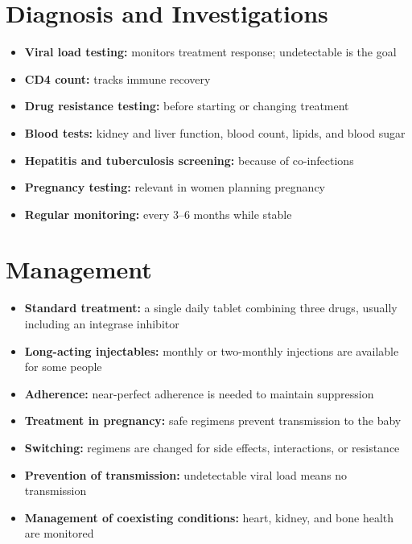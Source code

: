 \section*{Diagnosis and Investigations}
\begin{itemize}
    \item \textbf{Viral load testing:} monitors treatment response; undetectable is the goal
    \item \textbf{CD4 count:} tracks immune recovery
    \item \textbf{Drug resistance testing:} before starting or changing treatment
    \item \textbf{Blood tests:} kidney and liver function, blood count, lipids, and blood sugar
    \item \textbf{Hepatitis and tuberculosis screening:} because of co-infections
    \item \textbf{Pregnancy testing:} relevant in women planning pregnancy
    \item \textbf{Regular monitoring:} every 3--6 months while stable
\end{itemize}

\section*{Management}
\begin{itemize}
    \item \textbf{Standard treatment:} a single daily tablet combining three drugs, usually including an integrase inhibitor
    \item \textbf{Long-acting injectables:} monthly or two-monthly injections are available for some people
    \item \textbf{Adherence:} near-perfect adherence is needed to maintain suppression
    \item \textbf{Treatment in pregnancy:} safe regimens prevent transmission to the baby
    \item \textbf{Switching:} regimens are changed for side effects, interactions, or resistance
    \item \textbf{Prevention of transmission:} undetectable viral load means no transmission
    \item \textbf{Management of coexisting conditions:} heart, kidney, and bone health are monitored
\end{itemize}

